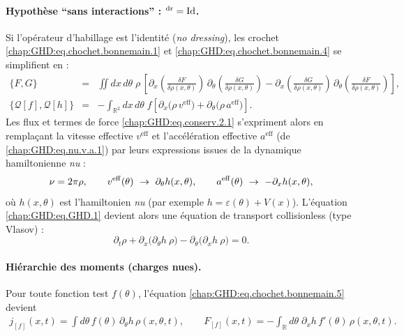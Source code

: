 \paragraph{Hypothèse ``sans interactions'' : $^{\rm dr}=\mathrm{Id}$.}
Si l’opérateur d’habillage est l’identité (\emph{no dressing}), les crochet \eqref{chap:GHD:eq.chochet.bonnemain.1} et \eqref{chap:GHD:eq.chochet.bonnemain.4} se simplifient en :
\begin{eqnarray}
	\{F,G\} & = &  \iint dx\,d\theta\;\rho \,\left[\partial_x \!\left( \frac{\delta F}{\delta \rho (x , \theta)} \right)\, \partial_\theta \!\left( \frac{\delta G}{\delta \rho (x , \theta)} \right) - \partial_x \!\left( \frac{\delta G}{\delta \rho (x , \theta)} \right) \, \partial_\theta \!\left( \frac{\delta F}{\delta \rho(x , \theta) } \right) \right],\\
	\{\mathcal{Q}[f], \mathcal{Q}[h]\} &=& - \int_{\mathbb{R}^2} dx\, d\theta \; f \left[ \partial_x \big( \rho \, v^{\mathrm{eff}} \big) 
	+ \partial_\theta \big( \rho \, a^{\mathrm{eff}} \big) \right].
\end{eqnarray}
Les flux et termes de force \eqref{chap:GHD:eq.conserv.2.1} s’expriment alors en remplaçant la vitesse effective $v^{\mathrm{eff}}$ et l’accélération effective $a^{\mathrm{eff}}$ (de \eqref{chap:GHD:eq.nu.v.a.1}) par leurs expressions issues de la dynamique hamiltonienne \emph{nu} :
\begin{equation}
	\nu = 2\pi \rho, \qquad v^{\rm eff}(\theta)\ \to\ \partial_\theta h(x,\theta), \qquad a^{\rm eff}(\theta)\ \to\ -\partial_x h(x,\theta),
\end{equation}
où $h(x,\theta)$ est l’hamiltonien \emph{nu} (par exemple $h=\varepsilon(\theta)+V(x)$). 
L’équation \eqref{chap:GHD:eq.GHD.1} devient alors une équation de transport collisionless (type Vlasov) :
\begin{equation}\label{eq:transport-libre}
  \partial_t \rho + \partial_x\!\big( \partial_\theta h\ \rho \big)
  - \partial_\theta\!\big( \partial_x h\ \rho \big) = 0.
\end{equation}

\paragraph{Hiérarchie des moments (charges nues).}
Pour toute fonction test $f(\theta)$, l'équation \eqref{chap:GHD:eq.chochet.bonnemain.5} devient
\begin{eqnarray}\label{chap:GHD:eq.flux.1}
j_{[f]}(x,t)=\int d\theta\, f(\theta)\,\partial_\theta h\,\rho(x,\theta,t), \qquad F_{[f]}(x,t) = -\int_{\mathbb{R}} d\theta \; \partial_x h \, f'(\theta)  \, \rho(x,\theta,t).
\end{eqnarray}

